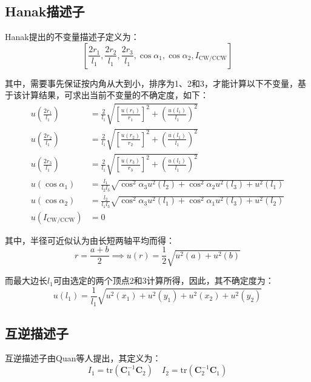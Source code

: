 \documentclass{article}
\begin{document}
\subsection{Hanak描述子}
Hanak\cite{hanakCraterIdentificationAlgorithm2010}提出的不变量描述子定义为：
\begin{equation}
  \left[\frac{2r_1}{l_1},\frac{2r_2}{l_1},\frac{2r_3}{l_1},\cos\alpha_1,\cos\alpha_2,I_\mathrm{CW/CCW}\right]
\end{equation}\par
其中，需要事先保证按内角从大到小，排序为1、2和3，才能计算以下不变量，基于该计算结果，可求出当前不变量的不确定度，如下：
\begin{equation}
  \begin{aligned}
    u\left(\frac{2r_1}{l_1}\right)&=\frac{2}{l_1}\sqrt{\left[\frac{u(r_1)}{r_1}\right]^2+\left(\frac{u(l_1)}{l_1}\right)^2}\\
    u\left(\frac{2r_2}{l_1}\right)&=\frac{2}{l_1}\sqrt{\left[\frac{u(r_2)}{r_2}\right]^2+\left(\frac{u(l_1)}{l_1}\right)^2}\\
    u\left(\frac{2r_3}{l_1}\right)&=\frac{2}{l_1}\sqrt{\left[\frac{u(r_3)}{r_3}\right]^2+\left(\frac{u(l_1)}{l_1}\right)^2}\\
    u(\cos\alpha_1)&=\frac{l_1}{l_2l_3}\sqrt{\cos^2\alpha_3u^2(l_2)+\cos^2\alpha_2u^2(l_3)+u^2(l_1)}\\
    u(\cos\alpha_2)&=\frac{l_2}{l_1l_3}\sqrt{\cos^2\alpha_3u^2(l_1)+\cos^2\alpha_1u^2(l_3)+u^2(l_2)}\\
    u(I_\mathrm{CW/CCW})&=0
  \end{aligned}
\end{equation}\par
其中，半径可近似认为由长短两轴平均而得：
\begin{equation*}
  r=\frac{a+b}{2}\implies u(r)=\frac{1}{2}\sqrt{u^2(a)+u^2(b)}
\end{equation*}\par
而最大边长$l_1$可由选定的两个顶点2和3计算所得，因此，其不确定度为：
\begin{equation*}
  u(l_1)=\frac{1}{l_1}\sqrt{u^2(x_1)+u^2(y_1)+u^2(x_2)+u^2(y_2)}
\end{equation*}\par
\subsection{互逆描述子}
互逆描述子由Quan\cite{quanInvariantsPairConics1992}等人提出，其定义为：
\begin{equation*}
  I_1 = \mathrm{tr}(\mathbf{C}_1^{-1}\mathbf{C}_2)\quad I_2 = \mathrm{tr}(\mathbf{C}_2^{-1}\mathbf{C}_1)
\end{equation*}\par
\end{document}
